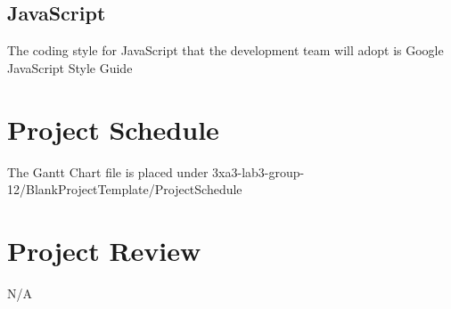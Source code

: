 \documentclass{article}
\begin{document}
\subsection{JavaScript}
The coding style for JavaScript that the development team will adopt is Google JavaScript Style Guide



\section{Project Schedule}

The Gantt Chart file is placed under 3xa3-lab3-group-12/BlankProjectTemplate/ProjectSchedule

\section{Project Review}
N/A
\end{document}
